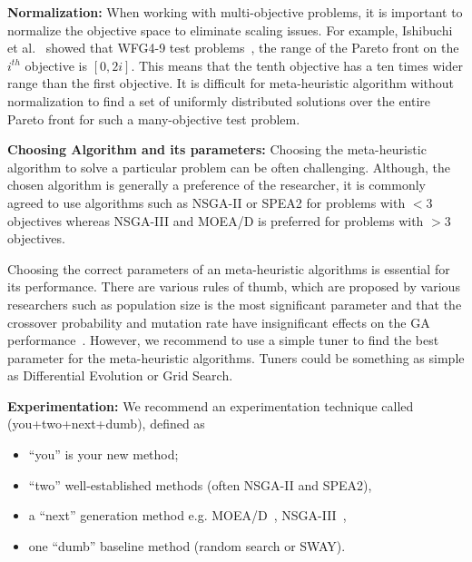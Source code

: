 \documentclass[sigconf,anonymous,review]{acmart}
\newcommand\TODO[1]{\textcolor{ScarletRed}{\textbf{\colorbox{yellow}{\small TODO:}} \emph{#1}}\xspace}
\begin{document}
  \noindent\textbf{Normalization: } When working with multi-objective problems, it is important to normalize the objective space to eliminate scaling issues. For example, Ishibuchi et al.~\cite{ishibuchi2017effect} showed that WFG4-9 test problems~\cite{huband2006review}, the range
of the Pareto front on the $i^{th}$ objective is $[0, 2i]$. This means
that the tenth objective has a ten times wider range than
the first objective. It is difficult for meta-heuristic algorithm without normalization
to find a set of uniformly distributed solutions over the entire Pareto front for such a many-objective test
problem. 

\noindent\textbf{Choosing Algorithm and its parameters: } {Choosing the meta-heuristic algorithm to solve a particular problem can be often challenging. Although, the chosen algorithm is generally a preference of the researcher, it is commonly agreed to use algorithms such as NSGA-II or SPEA2 for problems with $<3$ objectives whereas NSGA-III and MOEA/D is preferred for problems with $>3$ objectives.}

{Choosing the correct parameters of an meta-heuristic algorithms is essential for its performance. There are various rules of thumb, which are proposed by various researchers such as population size is the most significant parameter and that the crossover probability and mutation rate have insignificant effects on the GA performance~\cite{alajmi2014selecting}. However, we recommend to use a simple tuner to find the best parameter for the meta-heuristic algorithms. Tuners could be something as simple as Differential Evolution or Grid Search. }


 \noindent\textbf{Experimentation: } We recommend an experimentation technique called (you+two+next+dumb),  defined as 
\begin{itemize}
\item ``you'' is your new method;
    \item ``two''  well-established methods (often NSGA-II and SPEA2),
    \item a ``next''  generation method e.g. MOEA/D~\cite{zhang2007moea}, NSGA-III~\cite{deb2014evolutionary},
    \item  one ``dumb'' baseline method (random search or SWAY).
\end{itemize}
\end{document}
